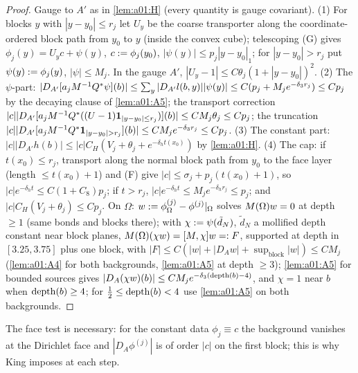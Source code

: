 \begin{proof}
Gauge to $A'$ as in \cref{lem:a01:H} (every quantity is gauge covariant). (1) For blocks $y$ with $|y-y_0|\le r_j$ let $U_y$ be the coarse transporter along the coordinate-ordered block path from $y_0$ to $y$ (inside the convex cube); telescoping (G) gives $\phi_j(y)=U_yc+\psi(y)$, $c:=\phi_j(y_0)$, $|\psi(y)|\le p_j|y-y_0|_1$; for $|y-y_0|>r_j$ put $\psi(y):=\phi_j(y)$, $|\psi|\le M_j$. In the gauge $A'$, $|U_y-1|\le C\theta_j(1+|y-y_0|)^2$. (2) The $\psi$-part: $|D_{A'}[a_jM^{-1}Q^*\psi](b)|\le\sum_y|D_{A'}l(b,y)||\psi(y)|\le C(p_j+M_je^{-\delta_3r_j})\le Cp_j$ by the decaying clause of \cref{lem:a01:A5}; the transport correction $|c||D_{A'}[a_jM^{-1}Q^*((U-1)\mathbf 1_{|y-y_0|\le r_j})](b)|\le CM_j\theta_j\le Cp_j$; the truncation $|c||D_{A'}[a_j\Mop^{-1}Q^*\mathbf 1_{|y-y_0|>r_j}](b)|\le CM_je^{-\delta_3r_j}\le Cp_j$. (3) The constant part: $|c||D_{A'}h(b)|\le|c|C_H(V_j+\theta_j+e^{-\delta_ht(x_0)})$ by \cref{lem:a01:H}. (4) The cap: if $t(x_0)\le r_j$, transport along the normal block path from $y_0$ to the face layer (length $\le t(x_0)+1$) and (F) give $|c|\le\sigma_j+p_j(t(x_0)+1)$, so $|c|e^{-\delta_ht}\le C(1+C_8)p_j$; if $t>r_j$, $|c|e^{-\delta_ht}\le M_je^{-\delta_hr_j}\le p_j$; and $|c|C_H(V_j+\theta_j)\le Cp_j$. On $\Omega$: $w:=\phi^{(j)}_\Omega-\phi^{(j)}|_\Omega$ solves $M(\Omega)w=0$ at depth $\ge1$ (same bonds and blocks there); with $\chi:=\psi(\tilde d_N)$, $\tilde d_N$ a mollified depth constant near block planes, $M(\Omega)(\chi w)=[M,\chi]w=:F$, supported at depth in $[3.25,3.75]$ plus one block, with $|F|\le C(|w|+|D_Aw|+\sup_{\text{block}}|w|)\le CM_j$ (\cref{lem:a01:A4} for both backgrounds, \cref{lem:a01:A5} at depth $\ge3$); \cref{lem:a01:A5} for bounded sources gives $|D_A(\chi w)(b)|\le CM_je^{-\delta_3(\operatorname{depth}(b)-4)}$, and $\chi=1$ near $b$ when $\operatorname{depth}(b)\ge4$; for $\frac12\le\operatorname{depth}(b)<4$ use \cref{lem:a01:A5} on both backgrounds.
\end{proof}

The face test is necessary: for the constant data $\phi_j\equiv c$ the background vanishes at the Dirichlet face and $|D_A\phi^{(j)}|$ is of order $|c|$ on the first block; this is why King imposes \cite[(5.41)]{K2} at each step.

